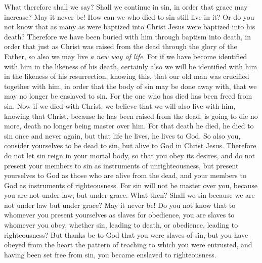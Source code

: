 \begin{biblechapter} %
 What therefore shall we say? Shall we continue in sin, in order that grace may increase?
\verse May it never be! How can we who died to sin still live in it?
\verse Or do you not know that as many as were baptized into Christ Jesus were baptized into his death?
\verse Therefore we have been buried with him through baptism into death, in order that just as Christ was raised from the dead through the glory of the Father, so also we may live \textit{a new way of life}.
\verse For if we have become identified with him in the likeness of his death, certainly also we will be identified with him in the likeness of his resurrection,
\verse knowing this, that our old man was crucified together with him, in order that the body of sin may be done away with, that we may no longer be enslaved to sin.
\verse For the one who has died has been freed from sin.
\verse Now if we died with Christ, we believe that we will also live with him,
\verse knowing that Christ, because he has been raised from the dead, is going to die no more, death no longer being master over him.
\verse For that death he died, he died to sin once and never again, but that life he lives, he lives to God.
\verse So also you, consider yourselves to be dead to sin, but alive to God in Christ Jesus.
\verse Therefore do not let sin reign in your mortal body, so that you obey its desires,
\verse and do not present your members to sin as instruments of unrighteousness, but present yourselves to God as those who are alive from the dead, and your members to God as instruments of righteousness.
\verse For sin will not be master over you, because you are not under law, but under grace.
 What then? Shall we sin because we are not under law but under grace? May it never be!
\verse Do you not know that to whomever you present yourselves as slaves for obedience, you are slaves to whomever you obey, whether sin, leading to death, or obedience, leading to righteousness?
\verse But thanks be to God that you were slaves of sin, but you have obeyed from the heart the pattern of teaching to which you were entrusted,
\verse and having been set free from sin, you became enslaved to righteousness.

\end{biblechapter}
